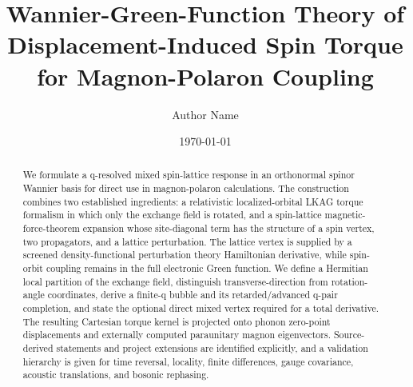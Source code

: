 \documentclass[aps,prb,preprint,superscriptaddress,nofootinbib]{revtex4-2}
\newcommand{\AuthorName}{Author Name}
\begin{document}
\title{Wannier-Green-Function Theory of Displacement-Induced Spin Torque for Magnon-Polaron Coupling}
\author{\AuthorName}
\date{\today}

\begin{abstract}
We formulate a q-resolved mixed spin-lattice response in an orthonormal spinor Wannier basis for direct use in magnon-polaron calculations. The construction combines two established ingredients: a relativistic localized-orbital LKAG torque formalism in which only the exchange field is rotated, and a spin-lattice magnetic-force-theorem expansion whose site-diagonal term has the structure of a spin vertex, two propagators, and a lattice perturbation. The lattice vertex is supplied by a screened density-functional perturbation theory Hamiltonian derivative, while spin-orbit coupling remains in the full electronic Green function. We define a Hermitian local partition of the exchange field, distinguish transverse-direction from rotation-angle coordinates, derive a finite-q bubble and its retarded/advanced q-pair completion, and state the optional direct mixed vertex required for a total derivative. The resulting Cartesian torque kernel is projected onto phonon zero-point displacements and externally computed paraunitary magnon eigenvectors. Source-derived statements and project extensions are identified explicitly, and a validation hierarchy is given for time reversal, locality, finite differences, gauge covariance, acoustic translations, and bosonic rephasing.
\end{abstract}

\maketitle
\tableofcontents













\appendix






\end{document}
